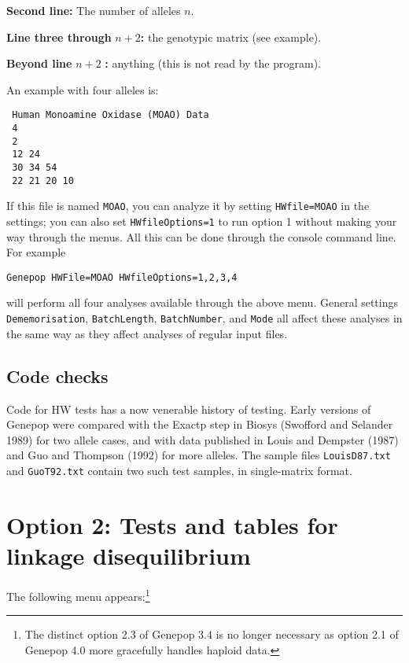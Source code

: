 \documentclass[12pt,]{book}
\let\rmarkdownfootnote\footnote%
\def\footnote{\protect\rmarkdownfootnote}
\begin{document}
\textbf{Second line:} The number of alleles \(n\).

\textbf{Line three through} \(n+2\)\textbf{:} the genotypic matrix (see
example).

\textbf{Beyond line} \(n+2\) \textbf{:} anything (this is not read by
the program).

An example with four alleles is:

\begin{verbatim}
 Human Monoamine Oxidase (MOAO) Data
 4
 2
 12 24
 30 34 54
 22 21 20 10
\end{verbatim}

If this file is named \texttt{MOAO}, you can analyze it by setting
\texttt{HWfile=MOAO} in the settings; you can also set
\texttt{HWfileOptions=1} to run option 1
without making your way through the menus. All this can be done through
the console command line. For example

\begin{verbatim}
Genepop HWFile=MOAO HWfileOptions=1,2,3,4
\end{verbatim}

will perform all four analyses available through the above menu. General
settings \texttt{Dememorisation}, \texttt{BatchLength},
\texttt{BatchNumber}, and \texttt{Mode} all affect these analyses in the
same way as they affect analyses of regular input files.

\subsection{Code checks}\label{code-checks}

 Code for HW tests has a now venerable history of
testing. Early versions of Genepop were compared with the Exactp step in
Biosys (Swofford and Selander 1989) for two allele cases, and with data
published in Louis and Dempster (1987) and Guo and Thompson (1992) for
more alleles. The sample files \texttt{LouisD87.txt} and
\texttt{GuoT92.txt} contain two such test samples, in single-matrix
format.

\section{Option 2: Tests and tables for linkage
disequilibrium}\label{option-2-tests-and-tables-for-linkage-disequilibrium}

The following menu appears:\footnote{The distinct option 2.3 of Genepop
  3.4 is no longer necessary as option 2.1 of Genepop 4.0 more
  gracefully handles haploid data.}
\end{document}
